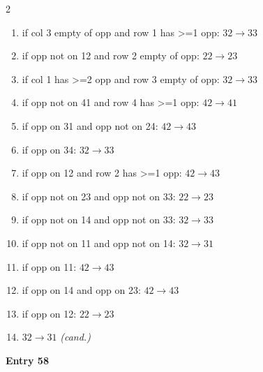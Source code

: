 \begin{multicols}{2}
\begin{tikzpicture}[scale=0.24]
\end{tikzpicture}
\nopagebreak\begin{enumerate}[topsep=1pt,itemsep=0pt,parsep=0pt,leftmargin=2.2em,label=\arabic*.]
\item if col 3 empty of opp and row 1 has >=1 opp: $32\!\to\!33$
\item if opp not on 12 and row 2 empty of opp: $22\!\to\!23$
\item if col 1 has >=2 opp and row 3 empty of opp: $32\!\to\!33$
\item if opp not on 41 and row 4 has >=1 opp: $42\!\to\!41$
\item if opp on 31 and opp not on 24: $42\!\to\!43$
\item if opp on 34: $32\!\to\!33$
\item if opp on 12 and row 2 has >=1 opp: $42\!\to\!43$
\item if opp not on 23 and opp not on 33: $22\!\to\!23$
\item if opp not on 14 and opp not on 33: $32\!\to\!33$
\item if opp not on 11 and opp not on 14: $32\!\to\!31$
\item if opp on 11: $42\!\to\!43$
\item if opp on 14 and opp on 23: $42\!\to\!43$
\item if opp on 12: $22\!\to\!23$
\item $32\!\to\!31$ \hfill\textit{(cand.)}
\end{enumerate}\smallskip
\noindent\textbf{Entry 58} \; 
\end{multicols}

